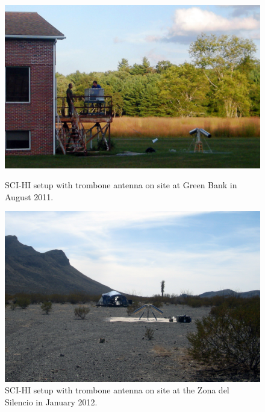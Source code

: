 \begin{figure}[htb]
\centering
\begin{minipage}[b]{0.48\textwidth}
\centering
\includegraphics[width=0.95\linewidth]{SCIHI_system/figures/trombone_gbt.jpg}
\caption{SCI-HI setup with trombone antenna on site at Green Bank in August 2011.}
\label{Fig:trombone_gbt}
\end{minipage}%
\begin{minipage}[b]{0.02\textwidth}
\hspace{1cm}
\end{minipage}%
\begin{minipage}[b]{0.46\textwidth}
\centering
\includegraphics[width=0.95\linewidth]{SCIHI_system/figures/trombone_sys_ZdS.jpg}
\caption{SCI-HI setup with trombone antenna on site at the Zona del Silencio in January 2012.}
\label{Fig:trombone_zds}
\end{minipage}
\end{figure}

